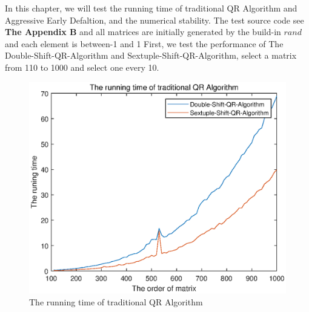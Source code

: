 In this chapter, we will test the running time of traditional QR Algorithm and Aggressive Early Defaltion, and the numerical stability. The test source code see \textbf{The Appendix B} and all matrices are initially generated by the build-in \(rand\) and each element is between-1 and 1
First, we test the performance of The Double-Shift-QR-Algorithm and Sextuple-Shift-QR-Algorithm, select a matrix from 110 to 1000 and select one every 10.
\begin{figure}[H]
\centering
\includegraphics{The running time of traditional QR Algorithm.eps}
\caption{The running time of traditional QR Algorithm}
\label{1}
\end{figure}

